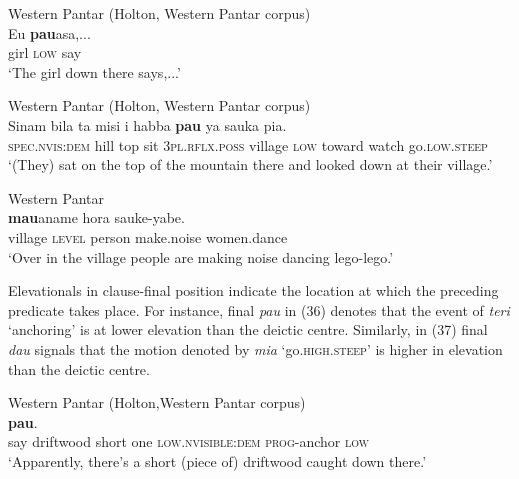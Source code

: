 \ea%
\label{ex:33}
    Western Pantar (Holton, Western Pantar corpus)  \\
\gll   Eu  \textbf{{pau}}{asa{\ng},...}\\
   girl  \textsc{low} say  \\
\glt   `The girl down there says,...'
\z









\ea%
\label{ex:34}
   Western Pantar (Holton, Western Pantar corpus)   \\
\gll  Sinam   {bila    ta{\ng}    misi{\ng}  i  habba{\ng}} \textbf{{pau}}{}   ya     {sauka{\ng}  pia.} \\
    \textsc{spec.nvis:dem} hill  top  sit  \textsc{3pl.rflx.poss} village  \textsc{low}   toward  watch  go\textsc{.low.steep} \\
\glt   `(They) sat on the top of the mountain there and looked down at their village.'
\z













\ea%
\label{ex:35}
   Western Pantar \citep[97]{HoltonEtAl2008}   \\
 \textbf{{mau}}{aname}  {hora{\ng}  sauke-yabe.}\\
  village  \textsc{level} person  make.noise  women.dance \\
\glt  `Over in the village people are making noise dancing lego-lego.'
\z







Elevationals in clause-final position indicate the location at which the preceding predicate takes place. For instance, final \textit{pau} in (36) denotes that the event of \textit{teri} `anchoring' is at lower elevation than the deictic centre. Similarly, in (37) final \textit{dau} signals that the motion denoted by \textit{mia} `go.\textsc{high.steep}' is higher in elevation than the deictic centre.



\ea%
\label{ex:36}
   Western Pantar (Holton,Western Pantar corpus)    \\
 \textbf{{pau}}{.}\\
  say  driftwood  short  one  \textsc{low.nvisible:dem} \textsc{prog}{}-anchor  \textsc{low} \\
\glt  `Apparently, there's a short (piece of) driftwood caught down there.'
\z









